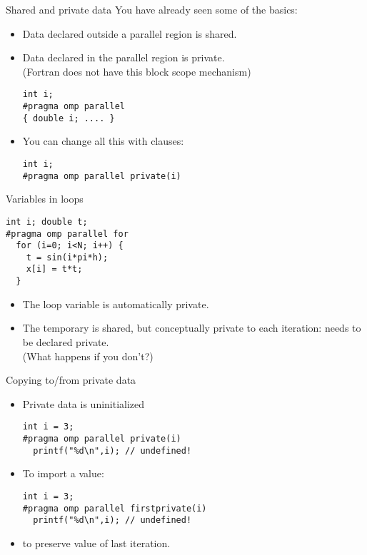 
\begin{frame}[containsverbatim]{Shared and private data}
  You have already seen some of the basics:
  \begin{itemize}
  \item Data declared outside a parallel region is shared.
  \item Data declared in the parallel region is private.\\
    (Fortran does not have this block scope mechanism)
\begin{verbatim}
int i;
#pragma omp parallel 
{ double i; .... }
\end{verbatim}
  \item You can change all this with clauses:
\begin{verbatim}
int i;
#pragma omp parallel private(i)
\end{verbatim}
  \end{itemize}
\end{frame}

\begin{frame}[containsverbatim]{Variables in loops}
\begin{verbatim}
int i; double t;
#pragma omp parallel for 
  for (i=0; i<N; i++) {
    t = sin(i*pi*h);
    x[i] = t*t;
  }
\end{verbatim}
  \begin{itemize}
  \item The loop variable is automatically private.
  \item The temporary  is shared, but conceptually private to
    each iteration: needs to be declared private.\\
    (What happens if you don't?)
  \end{itemize}
\end{frame}

\begin{frame}[containsverbatim]{Copying to/from private data}
  \begin{itemize}
  \item Private data is uninitialized
\begin{verbatim}
int i = 3;
#pragma omp parallel private(i)
  printf("%d\n",i); // undefined!
\end{verbatim}
  \item To import a value:
\begin{verbatim}
int i = 3;
#pragma omp parallel firstprivate(i)
  printf("%d\n",i); // undefined!
\end{verbatim}
  \item {} to preserve value of last iteration.
  \end{itemize}
\end{frame}

